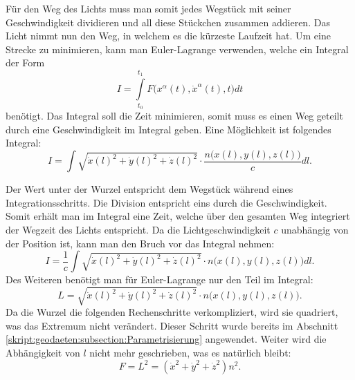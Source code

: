 \begin{refsection}
Für den Weg des Lichts muss man somit jedes Wegstück mit seiner
Geschwindigkeit dividieren und all diese Stückchen zusammen addieren.
Das Licht nimmt nun den Weg, in welchem es die kürzeste Laufzeit hat.
Um eine Strecke zu minimieren, kann man Euler-Lagrange verwenden,
welche ein Integral der Form
\begin{equation*}
  I = \int\limits_{t_0}^{t_1}\! F\bigl(x^{\alpha}(t), \dot{x}^{\alpha}(t),t\bigr)d t
\end{equation*}
benötigt.  Das Integral soll die Zeit minimieren, somit muss es einen
Weg geteilt durch eine Geschwindigkeit im Integral geben.  Eine
Möglichkeit ist folgendes Integral:
\begin{equation}
  I = \int\! \sqrt{\dot{x}(l)^2+\dot{y}(l)^2+\dot{z}(l)^2} \cdot
  \frac{n\bigl(x(l),y(l),z(l)\bigr)}{c} d l.
\end{equation}

Der Wert unter der Wurzel entspricht dem Wegstück während eines
Integrationsschritts.  Die Division entspricht eins durch die
Geschwindigkeit.  Somit erhält man im Integral eine Zeit, welche über
den gesamten Weg integriert der Wegzeit des Lichts entspricht.  Da die
Lichtgeschwindigkeit \(c\) unabhängig von der Position ist, kann man
den Bruch vor das Integral nehmen:
\begin{equation}
  I = \frac{1}{c}\int\! \sqrt{\dot{x}(l)^2+\dot{y}(l)^2+\dot{z}(l)^2}
  \cdot n\bigl(x(l),y(l),z(l)\bigr) d l.
\end{equation}
Des Weiteren benötigt man für Euler-Lagrange nur den Teil im Integral:
\begin{equation}
  L = \sqrt{\dot{x}(l)^2+\dot{y}(l)^2+\dot{z}(l)^2}
  \cdot n\bigl(x(l),y(l),z(l)\bigr).
\end{equation}
Da die Wurzel die folgenden Rechenschritte verkompliziert, wird sie
quadriert, was das Extremum nicht verändert.  Dieser Schritt wurde
bereits im Abschnitt
\ref{skript:geodaeten:subsection:Parametrisierung} angewendet.  Weiter
wird die Abhängigkeit von \(l\) nicht mehr geschrieben, was es
natürlich bleibt:
\begin{equation}
  F = L^2 = (\dot{x}^2+\dot{y}^2+\dot{z}^2)n^2.
\end{equation}


\end{refsection}
